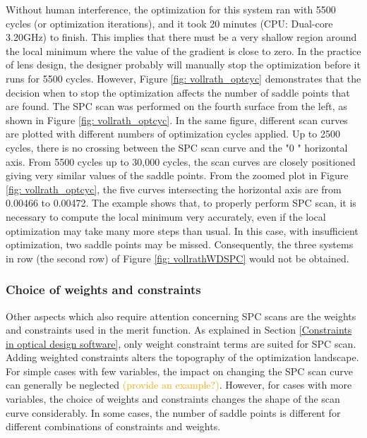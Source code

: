 Without human interference, the optimization for this system ran with 5500 cycles (or optimization iterations), and it took 20 minutes (CPU: Dual-core 3.20GHz) to finish. This implies that there must be a very shallow region around the local minimum where the value of the gradient is close to zero. In the practice of lens design, the designer probably will manually stop the optimization before it runs for 5500 cycles. However, Figure \ref{fig: vollrath_optcyc} demonstrates that the decision when to stop the optimization affects the number of saddle points that are found. The SPC scan was performed on the fourth surface from the left, as shown in Figure \ref{fig: vollrath_optcyc}. In the same figure, different scan curves are plotted with different numbers of optimization cycles applied. Up to 2500 cycles, there is no crossing between the SPC scan curve and the "$0$ " horizontal axis. From 5500 cycles up to 30,000 cycles, the scan curves are closely positioned giving very similar values of the saddle points. From the zoomed plot in Figure \ref{fig: vollrath_optcyc}, the five curves intersecting the horizontal axis are from 0.00466 to 0.00472. The example shows that, to properly perform SPC scan, it is necessary to compute the local minimum very accurately, even if the local optimization may take many more steps than usual. In this case, with insufficient optimization, two saddle points may be missed. Consequently, the three systems in row  (the second row) of Figure \ref{fig: vollrathWDSPC} would not be obtained. 

\subsubsection{Choice of weights and constraints}
Other aspects which also require attention concerning SPC scans are the weights and constraints used in the merit function. As explained in Section \ref{Constraints in optical design software}, only weight constraint terms are suited for SPC scan. Adding weighted constraints alters the topography of the optimization landscape. For simple cases with few variables, the impact on changing the SPC scan curve can generally be neglected \textcolor{orange}{(provide an example?)}. However, for cases with more variables, the choice of weights and constraints changes the shape of the scan curve considerably. In some cases, the number of saddle points is different for different combinations of constraints and weights. 

